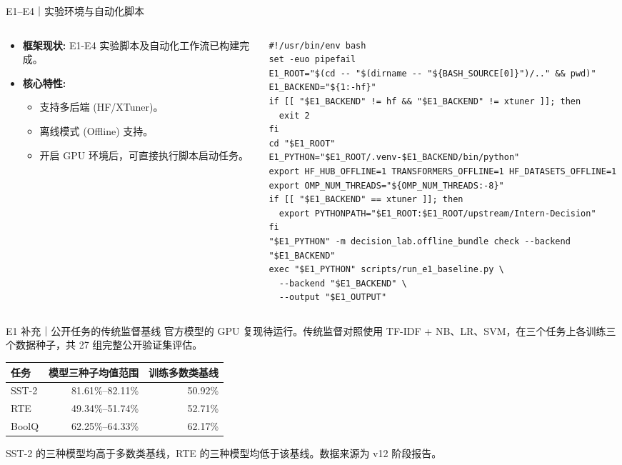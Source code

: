 \documentclass{beamer}
\begin{document}
\begin{frame}[fragile]{E1--E4｜实验环境与自动化脚本}
  \begin{columns}[T]
    \begin{column}{0.35\textwidth}
      \begin{itemize}
        \item \textbf{框架现状:} E1-E4 实验脚本及自动化工作流已构建完成。
        \item \textbf{核心特性:}
        \begin{itemize}
          \item 支持多后端 (HF/XTuner)。
          \item 离线模式 (Offline) 支持。
          \item 开启 GPU 环境后，可直接执行脚本启动任务。
        \end{itemize}
      \end{itemize}
    \end{column}
    \begin{column}{0.65\textwidth}
      \tiny
      \begin{verbatim}
#!/usr/bin/env bash
set -euo pipefail
E1_ROOT="$(cd -- "$(dirname -- "${BASH_SOURCE[0]}")/.." && pwd)"
E1_BACKEND="${1:-hf}"
if [[ "$E1_BACKEND" != hf && "$E1_BACKEND" != xtuner ]]; then
  exit 2
fi
cd "$E1_ROOT"
E1_PYTHON="$E1_ROOT/.venv-$E1_BACKEND/bin/python"
export HF_HUB_OFFLINE=1 TRANSFORMERS_OFFLINE=1 HF_DATASETS_OFFLINE=1
export OMP_NUM_THREADS="${OMP_NUM_THREADS:-8}"
if [[ "$E1_BACKEND" == xtuner ]]; then
  export PYTHONPATH="$E1_ROOT:$E1_ROOT/upstream/Intern-Decision"
fi
"$E1_PYTHON" -m decision_lab.offline_bundle check --backend "$E1_BACKEND"
exec "$E1_PYTHON" scripts/run_e1_baseline.py \
  --backend "$E1_BACKEND" \
  --output "$E1_OUTPUT"
\end{verbatim}
    \end{column}
  \end{columns}
\end{frame}

\begin{frame}{E1 补充｜公开任务的传统监督基线}
  \small
  官方模型的 GPU 复现待运行。传统监督对照使用 TF-IDF + NB、LR、SVM，在三个任务上各训练三个数据种子，共 27 组完整公开验证集评估。

  \medskip
  \centering
  \begin{tabular}{@{}lrr@{}}
    \toprule
    \textbf{任务} & \textbf{模型三种子均值范围} & \textbf{训练多数类基线}\\
    \midrule
    SST-2 & 81.61\%--82.11\% & 50.92\%\\
    RTE   & 49.34\%--51.74\% & 52.71\%\\
    BoolQ & 62.25\%--64.33\% & 62.17\%\\
    \bottomrule
  \end{tabular}

  \medskip
  \raggedright
  \footnotesize SST-2 的三种模型均高于多数类基线，RTE 的三种模型均低于该基线。数据来源为 v12 阶段报告。
\end{frame}
\end{document}
